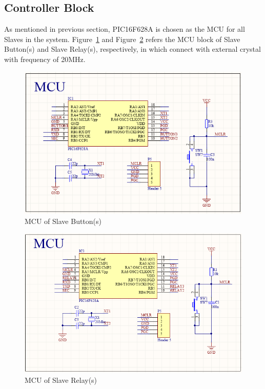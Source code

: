   \subsection{Controller Block}
  As mentioned in previous section, PIC16F628A is chosen as the MCU for all Slaves in the system. Figure~\ref{fig:mcuButton} and Figure~\ref{fig:mcuRelay} refers the MCU block of Slave Button(s) and Slave Relay(s), respectively, in which connect with external crystal with frequency of 20MHz.
  \begin{figure}[!ht]
    \begin{center}
    \includegraphics[scale=0.93]{images/mcuButton.png}
    \caption{MCU of Slave Button(s)}
    \label{fig:mcuButton}
    \end{center}
\end{figure}
\begin{figure}[!ht]
    \begin{center}
    \includegraphics[scale=0.8]{images/mcuRelay.png}
    \caption{MCU of Slave Relay(s)}
    \label{fig:mcuRelay}
    \end{center}
\end{figure}

